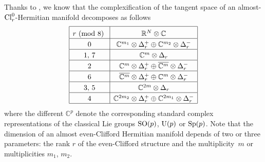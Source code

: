 \documentclass[10pt,a4paper]{amsart}
\newcommand\tstrut{\rule{0pt}{2.6ex}}
\numberwithin{equation}{section}
\begin{document}
Thanks to \cite{Arizmendi-Herrera}, we know that the complexif\/ication of the tangent space of an almost-${\rm Cl}_r^0$-Hermitian manifold decomposes as follows
\begin{gather}
\begin{array}{|c|c|}
 \hline
 r \mbox{\ {\rm (mod 8)} } &\mathbb{R}^N\otimes \mathbb{C}
\rule{0pt}{3ex}\\
\hline
 0 & \mathbb{C}^{m_1}\otimes \Delta_r^+ \oplus \mathbb{C}^{m_2}\otimes \Delta_r^-\tstrut\\
 \hline
 1,\,7 & \mathbb{C}^m\otimes \Delta_r\tstrut\\
\hline
 2 & \mathbb{C}^m\otimes \Delta_r^+\oplus\overline{\mathbb{C}^m}\otimes\Delta_r^-\tstrut\\
\hline
 6 & \overline{\mathbb{C}^m}\otimes \Delta_r^+\oplus \mathbb{C}^m\otimes\Delta_r^-\tstrut\\
\hline
 3,\,5 & \mathbb{C}^{2m}\otimes \Delta_r\tstrut\\
\hline
 4 & \mathbb{C}^{2m_2}\otimes \Delta_r^+ \oplus \mathbb{C}^{2m_1}\otimes \Delta_r^-\tstrut\\
\hline
 \end{array}\label{eq: complexified R^N}
\end{gather}
where the dif\/ferent $\mathbb{C}^p$ denote the corresponding standard complex representations of the classical Lie groups ${\rm SO}(p)$, ${\rm U}(p)$ or ${\rm Sp}(p)$. Note that the dimension of an almost even-Clif\/ford Hermitian manifold depends of two or three parameters: the rank $r$ of the even-Clif\/ford structure and the multiplicity~$m$ or multiplicities $m_1$, $m_2$.
\end{document}
